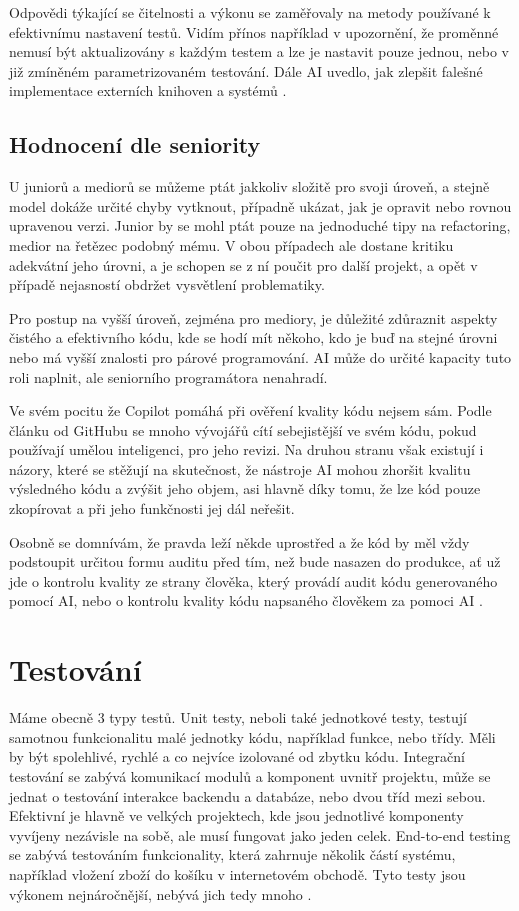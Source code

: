 \documentclass[FM,DP]{tulthesis}
\begin{document}
		Odpovědi týkající se čitelnosti a výkonu se zaměřovaly na metody používané k efektivnímu nastavení testů. Vidím přínos například v upozornění, že proměnné nemusí být aktualizovány s každým testem a lze je nastavit pouze jednou, nebo v již zmíněném parametrizovaném testování. Dále AI uvedlo, jak zlepšit falešné implementace externích knihoven a systémů \cite{parametrized_testing_fe} \cite{testing}.
		
		
		\subsection{Hodnocení dle seniority}
		U juniorů a mediorů se můžeme ptát jakkoliv složitě pro svoji úroveň, a stejně model dokáže určité chyby vytknout, případně ukázat, jak je opravit nebo rovnou upravenou verzi. Junior by se mohl ptát pouze na jednoduché tipy na refactoring, medior na řetězec podobný mému. V obou případech ale dostane kritiku adekvátní jeho úrovni, a je schopen se z ní poučit pro další projekt, a opět v případě nejasností obdržet vysvětlení problematiky. 
		
		Pro postup na vyšší úroveň, zejména pro mediory, je důležité zdůraznit aspekty čistého a efektivního kódu, kde se hodí mít někoho, kdo je buď na stejné úrovni nebo má vyšší znalosti pro párové programování. AI může do určité kapacity tuto roli naplnit, ale seniorního programátora nenahradí.
		
		Ve svém pocitu že Copilot pomáhá při ověření kvality kódu nejsem sám. Podle článku od GitHubu se mnoho vývojářů cítí sebejistější ve svém kódu, pokud používají umělou inteligenci, pro jeho revizi. Na druhou stranu však existují i názory, které se stěžují na skutečnost, že nástroje AI mohou zhoršit kvalitu výsledného kódu a zvýšit jeho objem, asi hlavně díky tomu, že lze kód pouze zkopírovat a při jeho funkčnosti jej dál neřešit. 
		
		Osobně se domnívám, že pravda leží někde uprostřed a že kód by měl vždy podstoupit určitou formu auditu před tím, než bude nasazen do produkce, ať už jde o kontrolu kvality ze strany člověka, který provádí audit kódu generovaného pomocí AI, nebo o kontrolu kvality kódu napsaného člověkem za pomoci AI \cite{copilot:code_churn} \cite{copilot:benefits}.
		
		
		\section{Testování}
		Máme obecně 3 typy testů. Unit testy, neboli také jednotkové testy, testují samotnou funkcionalitu malé jednotky kódu, například funkce, nebo třídy. Měli by být spolehlivé, rychlé a co nejvíce izolované od zbytku kódu. Integrační testování se zabývá komunikací modulů a komponent uvnitř projektu, může se jednat o testování interakce backendu a databáze, nebo dvou tříd mezi sebou. Efektivní je hlavně ve velkých projektech, kde jsou jednotlivé komponenty vyvíjeny nezávisle na sobě, ale musí fungovat jako jeden celek. End-to-end testing se zabývá testováním funkcionality, která zahrnuje několik částí systému, například vložení zboží do košíku v internetovém obchodě. Tyto testy jsou výkonem nejnáročnější, nebývá jich tedy mnoho \cite{testing}.
		
\end{document}
